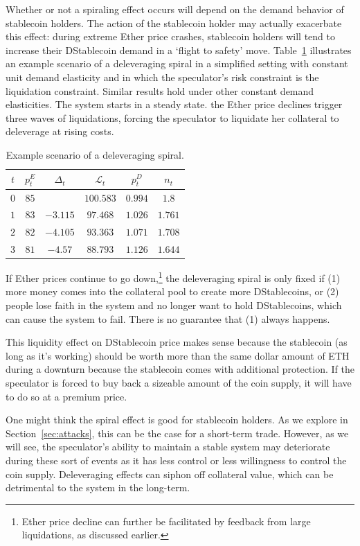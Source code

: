 Whether or not a spiraling effect occurs will depend on the demand behavior of stablecoin holders. The action of the stablecoin holder may actually exacerbate this effect: during extreme Ether price crashes, stablecoin holders will tend to increase their DStablecoin demand in a `flight to safety' move. Table~\ref{table:delev_spiral} illustrates an example scenario of a deleveraging spiral in a simplified setting with constant unit demand elasticity and in which the speculator's risk constraint is the liquidation constraint. Similar results hold under other constant demand elasticities. The system starts in a steady state. the Ether price declines trigger three waves of liquidations, forcing the speculator to liquidate her collateral to deleverage at rising costs.

\begin{table}
	\centering
	\begin{tabular}{c|c|c|c|c|c}
		$t$ & $p_t^E$ & $\Delta_t$ & $\mathcal{L}_t$ & $p_t^D$ & $n_t$ \\
		\hline
		$0$ & $85$ & & $100.583$ & $0.994$ & $1.8$ \\
		$1$ & $83$ & $-3.115$ & $97.468$ & $1.026$ & $1.761$ \\
		$2$ & $82$ & $-4.105$ & $93.363$ & $1.071$ & $1.708$ \\
		$3$ & $81$ & $-4.57$ & $88.793$ & $1.126$ & $1.644$ \\
	\end{tabular}
	\caption{Example scenario of a deleveraging spiral.}\label{table:delev_spiral}
\end{table}

If Ether prices continue to go down,\footnote{Ether price decline can further be facilitated by feedback from large liquidations, as discussed earlier.} the deleveraging spiral is only fixed if (1) more money comes into the collateral pool to create more DStablecoins, or (2) people lose faith in the system and no longer want to hold DStablecoins, which can cause the system to fail. There is no guarantee that (1) always happens.

This liquidity effect on DStablecoin price makes sense because the stablecoin (as long as it's working) should be worth more than the same dollar amount of ETH during a downturn because the stablecoin comes with additional protection. If the speculator is forced to buy back a sizeable amount of the coin supply, it will have to do so at a premium price.

One might think the spiral effect is good for stablecoin holders. As we explore in Section~\ref{sec:attacks}, this can be the case for a short-term trade. However, as we will see, the speculator's ability to maintain a stable system may deteriorate during these sort of events as it has less control or less willingness to control the coin supply. Deleveraging effects can siphon off collateral value, which can be detrimental to the system in the long-term.

